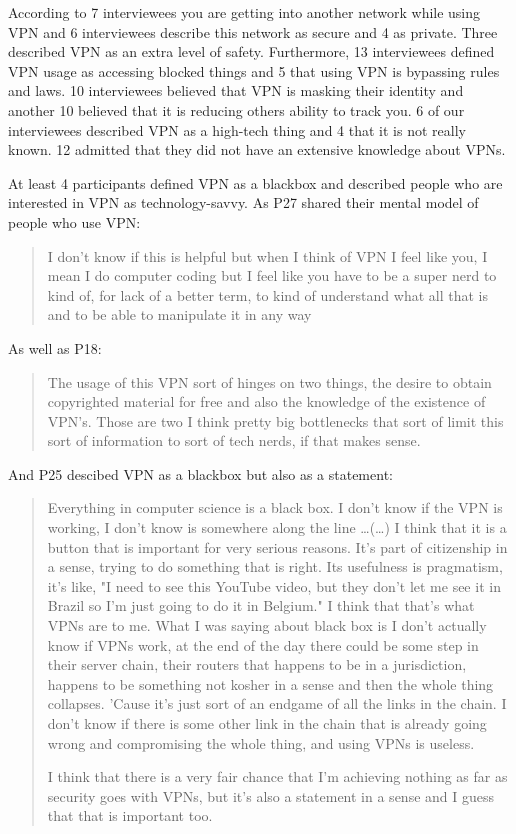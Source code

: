According to 7 interviewees you are getting into another network while using VPN and 6 interviewees describe this network as secure and 4 as private. 
Three described VPN as an extra level of safety. Furthermore, 13 interviewees defined VPN usage as accessing blocked things and 5 that using VPN is bypassing rules and laws. 10 interviewees believed that VPN is masking their identity and another 10 believed that it is reducing others ability to track you.  6 of our interviewees described VPN as a high-tech thing and 4 that it is not really known. 12 admitted that they did not have an extensive knowledge about VPNs.

At least 4 participants defined VPN as a blackbox and described people who are interested in VPN as technology-savvy. As P27 shared their mental model of people who use VPN: 
\begin{quote}I don't know if this is helpful but when I think of VPN I feel like you, I mean I do computer coding but I feel like you have to be a super nerd to kind of, for lack of a better term, to kind of understand what all that is and to be able to manipulate it in any way\end{quote}


As well as P18:
\begin{quote}The usage of this VPN sort of hinges on two things, the desire to obtain copyrighted material for free and also the knowledge of the existence of VPN's. Those are two I think pretty big bottlenecks that sort of limit this sort of information to sort of tech nerds, if that makes sense.\end{quote}


And P25 descibed VPN as a blackbox but also as a statement:
\begin{quote}Everything in computer science is a black box. I don't know if the VPN is working, I don't know is somewhere along the line \dots (\dots)
I think that it is a button that is important for very serious reasons. It's part of citizenship in a sense, trying to do something that is right. Its usefulness is pragmatism, it's like, "I need to see this YouTube video, but they don't let me see it in Brazil so I'm just going to do it in Belgium." I think that that's what VPNs are to me. What I was saying about black box is I don't actually know if VPNs work, at the end of the day there could be some step in their server chain, their routers that happens to be in a jurisdiction, happens to be something not kosher in a sense and then the whole thing collapses. 'Cause it's just sort of an endgame of all the links in the chain. I don't know if there is some other link in the chain that is already going wrong and compromising the whole thing, and using VPNs is useless.


I think that there is a very fair chance that I'm achieving nothing as far as security goes with VPNs, but it's also a statement in a sense and I guess that that is important too.\end{quote}

